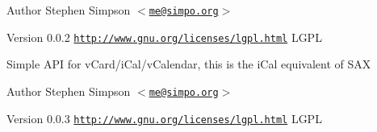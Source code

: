 \begin{DoxyAuthor}{Author}
Stephen Simpson $<$\href{mailto:me@simpo.org}{\tt me@simpo.org}$>$ 
\end{DoxyAuthor}
\begin{DoxyVersion}{Version}
0.0.2  \href{http://www.gnu.org/licenses/lgpl.html}{\tt http://www.gnu.org/licenses/lgpl.html} LGPL
\end{DoxyVersion}
Simple API for vCard/iCal/vCalendar, this is the iCal equivalent of SAX

\begin{DoxyAuthor}{Author}
Stephen Simpson $<$\href{mailto:me@simpo.org}{\tt me@simpo.org}$>$ 
\end{DoxyAuthor}
\begin{DoxyVersion}{Version}
0.0.3  \href{http://www.gnu.org/licenses/lgpl.html}{\tt http://www.gnu.org/licenses/lgpl.html} LGPL 
\end{DoxyVersion}
